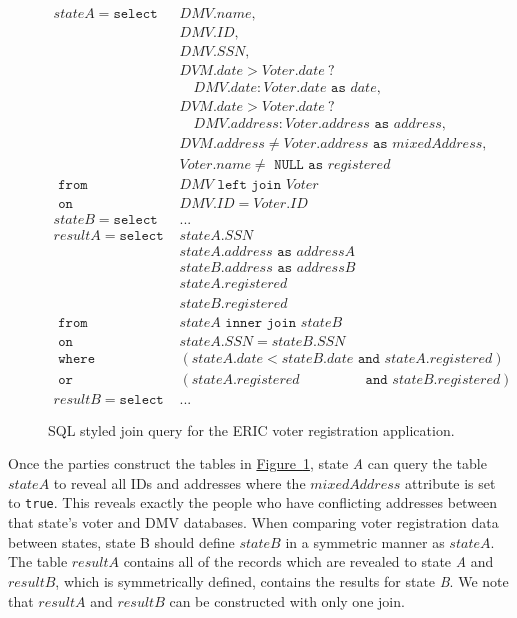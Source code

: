 \documentclass[11pt,letterpaper]{article}
\newcommand{\namedref}[2]{\hyperref[#2]{#1~\ref*{#2}}}
\newcommand{\figureref}[1]{\namedref{Figure}{#1}}
\begin{document}
\begin{figure}[ht]
	
	{
		\scriptsize
		\begin{align*}	
		stateA = \texttt{select }& DMV.name,\\
		& DMV.ID, \\
		& DMV.SSN, \\
		& DVM.date > Voter.date \ ?\\
		&\quad DMV.date : Voter.date \texttt{ as } date,\\
		& DVM.date > Voter.date \ ?\\
		&\quad  DMV.address : Voter.address \texttt{ as } address,\\
		& DVM.address \neq Voter.address \texttt{ as } mixedAddress, \\ 
		& Voter.name \neq \texttt{ NULL as } registered \\
		\texttt{ from } & DMV \texttt{ left join } Voter \\
		\texttt{ on } & DMV.ID = Voter.ID \\
		stateB = \texttt{select }&...\\
		resultA = \texttt{select } & stateA.SSN \\
		& stateA.address \texttt{ as } addressA\\
		& stateB.address \texttt{ as } addressB\\
		& stateA.registered \\
		& stateB.registered \\
		\texttt{ from } & stateA \texttt{ inner join } stateB \\
		\texttt{ on } & stateA.SSN = stateB.SSN\\
		\texttt{ where } & (stateA.date < stateB.date \texttt{ and } stateA.registered ) \\
		\texttt{ or } & (stateA.registered \qquad \qquad \ \, \texttt{ and }stateB.registered )\\
		resultB = \texttt{select } & ...
		\end{align*}
	}
	\caption{SQL styled join query for the ERIC voter registration application. \label{fig:voterQuery}}
\end{figure}

Once the parties construct the tables in \figureref{fig:voterQuery}, state \emph{A} can query the table $stateA$ to reveal all IDs and addresses where the $mixedAddress$ attribute is set to \texttt{true}. This reveals exactly the people who have conflicting addresses between that state's voter and DMV databases. When comparing voter registration data between states, state B should define $stateB$ in a symmetric manner as $stateA$. The table $resultA$ contains all of the records which are revealed to state \emph{A} and $resultB$, which is symmetrically defined, contains the results for state \emph{B}. We note that $resultA$ and $resultB$ can be constructed with only one join.
\end{document}
